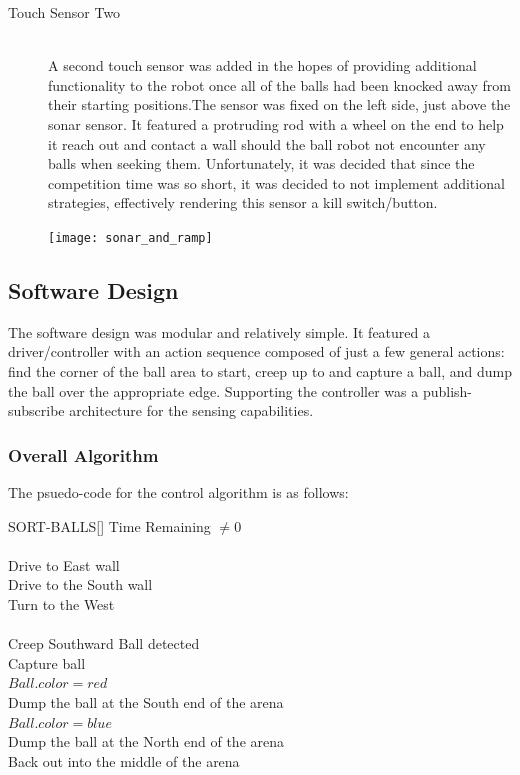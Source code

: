 \documentclass{article}
\begin{document}
\begin{description}
  \item[Touch Sensor Two] \hfill \\
  A second touch sensor was added in the hopes of providing additional functionality to the robot once all of the balls had been knocked away from their starting positions.The sensor was fixed on the left side, just above the sonar sensor. It featured a protruding rod with a wheel on the end to help it reach out and contact a wall should the ball robot not encounter any balls when seeking them. Unfortunately, it was decided that since the competition time was so short, it was decided to not implement additional strategies, effectively rendering this sensor a kill switch/button.
\end{description}

  \begin{figure}[h]
    \centering
    \texttt{[image: sonar\_and\_ramp]}
    \caption{}
    \label{fig:sonar_and_bump_sensors}
  \end{figure}

\newpage
\subsection{Software Design}
The software design was modular and relatively simple. It featured a driver/controller with an action sequence composed of just a few general actions: find the corner of the ball area to start, creep up to and capture a ball, and dump the ball over the appropriate edge. Supporting the controller was a publish-subscribe architecture for the sensing capabilities.

\subsubsection{Overall Algorithm}
The psuedo-code for the control algorithm is as follows: \\
\begin{algorithm}{SORT-BALLS}[]{}
  \qwhile Time Remaining $\neq 0$ \\
  \qdo \\
    Drive to East wall \\
    Drive to the South wall \\
    Turn to the West \\
    \qrepeat \\
      Creep Southward
    \quntil Ball detected \\
    Capture ball \\
    \qif $Ball.color = red$ \\
      \qthen Dump the ball at the South end of the arena \\
      \qelse \qif $Ball.color = blue$ \\
        \qthen Dump the ball at the North end of the arena \qfi \qfi \\

    Back out into the middle of the arena
  \qend
\end{algorithm}
\end{document}
